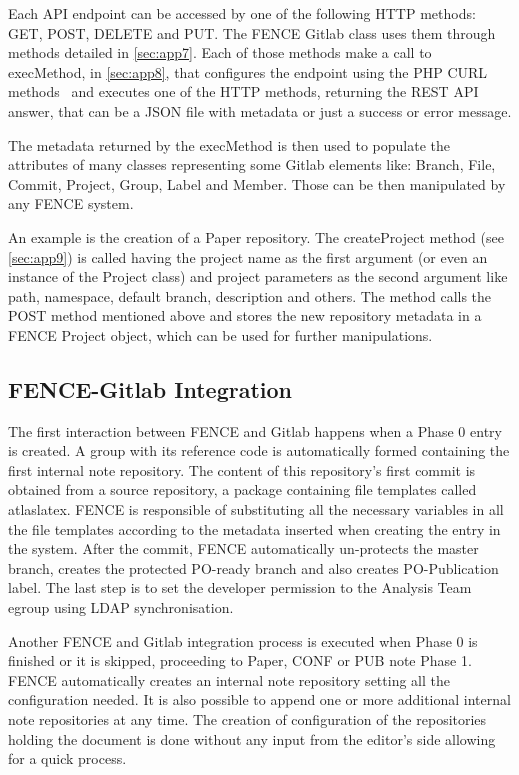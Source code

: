Each API endpoint can be accessed by one of the following HTTP methods: GET, POST, DELETE and PUT. The FENCE Gitlab class uses them through methods detailed in \ref{sec:app7}. Each of those methods make a call to execMethod, in \ref{sec:app8}, that configures the endpoint using the PHP CURL methods~\cite{php_curl} and executes one of the HTTP methods, returning the REST API answer, that can be a JSON file with metadata or just a success or error message.

The metadata returned by the execMethod is then used to populate the attributes of many classes representing some Gitlab elements like: Branch, File, Commit, Project, Group, Label and Member. Those can be then manipulated by any FENCE system.

An example is the creation of a Paper repository. The createProject method (see \ref{sec:app9}) is called having the project name as the first argument (or even an instance of the Project class) and project parameters as the second argument like path, namespace, default branch, description and others. The method calls the POST method mentioned above and stores the new repository metadata in a FENCE Project object, which can be used for further manipulations.

\subsection{FENCE-Gitlab Integration}
\label{sec:FENCE-Gitlab_Integration}
The first interaction between FENCE and Gitlab happens when a Phase 0 entry is created. A group with its reference code is automatically formed containing the first internal note repository. The content of this repository’s first commit is obtained from a source repository, a package containing file templates called atlaslatex. FENCE is responsible of substituting all the necessary variables in all the file templates according to the metadata inserted when creating the entry in the system. After the commit, FENCE automatically un-protects the master branch, creates the protected PO-ready branch and also creates PO-Publication label. The last step is to set the developer permission to the Analysis Team egroup using LDAP synchronisation.
                    
Another FENCE and Gitlab integration process is executed when Phase 0 is finished or it is skipped, proceeding to Paper, CONF or PUB note Phase 1. FENCE automatically creates an internal note repository setting all the configuration needed. It is also possible to append one or more additional internal note repositories at any time. The creation of configuration of the repositories holding the document is done without any input from the editor’s side allowing for a quick process. 

